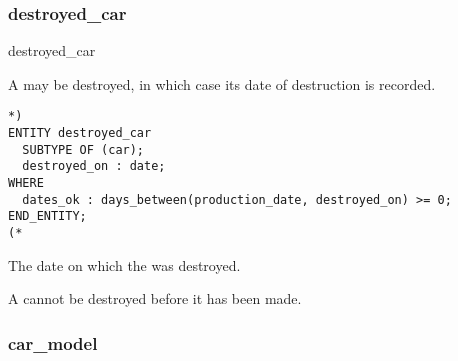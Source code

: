\documentclass{article}
\begin{document}
\subsubsection{destroyed\_car}

\begin{Mnamedesc}{destroyed_car}
\begin{Mdesctext}
    A  may be destroyed, in which case its date of destruction is
recorded.
\end{Mdesctext}

\begin{Mexp}
\begin{verbatim}
*)
ENTITY destroyed_car
  SUBTYPE OF (car);
  destroyed_on : date;
WHERE
  dates_ok : days_between(production_date, destroyed_on) >= 0;
END_ENTITY;
(*
\end{verbatim}
\end{Mexp}

\begin{Matts}

\item[destroyed\_on:] The date on which the  was destroyed.
\end{Matts}

\begin{Mprops}

\item[dates\_ok:] A  cannot be destroyed before it has been made.
\end{Mprops}
\end{Mnamedesc}

\subsubsection{car\_model}
\end{document}
